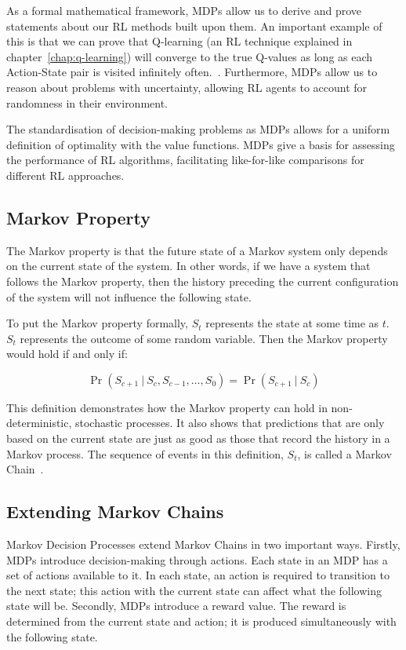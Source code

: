 \documentclass[]{final_report}
\begin{document}
As a formal mathematical framework, MDPs allow us to derive and prove statements about our RL methods built upon them. An important example of this is that we can prove that Q-learning (an RL technique explained in chapter~\ref{chap:q-learning}) will converge to the true Q-values as long as each Action-State pair is visited infinitely often.~\cite{watkins1992q}. Furthermore, MDPs allow us to reason about problems with uncertainty, allowing RL agents to account for randomness in their environment. 

The standardisation of decision-making problems as MDPs allows for a uniform definition of optimality with the value functions. MDPs give a basis for assessing the performance of RL algorithms, facilitating like-for-like comparisons for different RL approaches. 


\subsection{Markov Property}

The Markov property is that the future state of a Markov system only depends on the current state of the system. In other words, if we have a system that follows the Markov property, then the history preceding the current configuration of the system will not influence the following state.

To put the Markov property formally, $S_t$ represents the state at some time as $t$. $S_t$ represents the outcome of some random variable. Then the Markov property would hold if and only if:


\begin{equation}
  \Pr(S_{c+1}\ |\ S_{c},S_{c-1},\dots,S_0) = \Pr(S_{c+1}\ |\ S_{c})
  \label{eqn:markov-property}
\end{equation}

This definition demonstrates how the Markov property can hold in non-deterministic, stochastic processes. It also shows that predictions that are only based on the current state are just as good as those that record the history in a Markov process. The sequence of events in this definition, $S_t$, is called a Markov Chain~\cite{meyn2012markov}.

\subsection{Extending Markov Chains}

Markov Decision Processes extend Markov Chains in two important ways. Firstly, MDPs introduce decision-making through actions. Each state in an MDP has a set of actions available to it. In each state, an action is required to transition to the next state; this action with the current state can affect what the following state will be. Secondly, MDPs introduce a reward value. The reward is determined from the current state and action; it is produced simultaneously with the following state.
\end{document}
